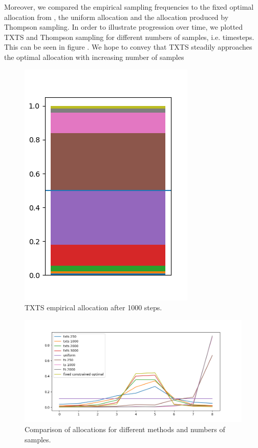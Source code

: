Moreover, we compared the empirical sampling frequencies to the fixed optimal
allocation from , the uniform
allocation and the allocation produced by Thompson sampling. In order to
illustrate progression over time, we plotted TXTS and Thompson sampling for
different numbers of samples, i.e. timesteps. This can be seen in figure
. We hope to convey that TXTS steadily
approaches the optimal allocation with increasing number of samples
\begin{figure}[h]
  \centering
  \includegraphics[width=.25\textwidth]{190723-selections_2.png}
  \caption{TXTS empirical allocation after 1000 steps.}
  \label{fig:measurement_plan}
\end{figure}
\begin{figure}[h]
  \centering
  \includegraphics[width=\textwidth]{191112-selection.png}
  \caption{Comparison of allocations for different methods and numbers of
      samples.}
  \label{fig:measurement_plan_comparison}
\end{figure}

